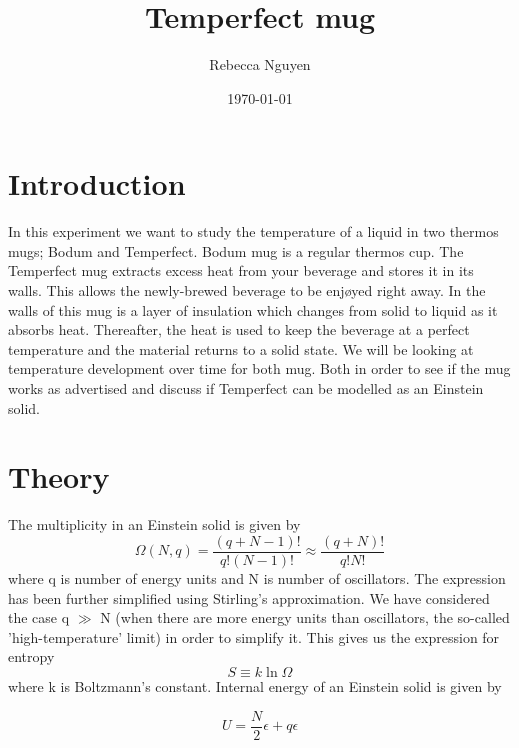 \documentclass[reprint,english,notitlepage]{revtex4-2}
\begin{document}
\title{Temperfect mug}   %
\author{Rebecca Nguyen}               %
\date{\today}                             %
\noaffiliation
\maketitle                                %


\section{Introduction}
In this experiment we want to study the temperature of a liquid in two thermos mugs; Bodum and Temperfect.
Bodum mug is a regular thermos cup. The Temperfect mug extracts excess heat from your beverage and stores it in its walls. This allows the newly-brewed beverage to
be enjøyed right away. In the walls of this mug is a layer of insulation which changes from solid to liquid as it absorbs heat. Thereafter, the heat is used to keep
the beverage at a perfect temperature and the material returns to a solid state.
We will be looking at temperature development over time for both mug. Both in order to see if the mug works as advertised and discuss if Temperfect can be modelled
as an Einstein solid.

\section{Theory}
The multiplicity in an Einstein solid is given by
\begin{equation}
  \Omega(N, q) = \frac{(q+N -1)!}{q! (N -1)!} \approx \frac{(q+N)!}{q!N!}
\end{equation}
where q is number of energy units and N is number of oscillators. The expression has been further simplified using Stirling's approximation. We have considered the case q $\gg$ N (when there are
more energy units than oscillators, the so-called 'high-temperature' limit) in order to simplify it.
This gives us the expression for entropy
\begin{equation}
  S \equiv k \ln\Omega
\end{equation}
where k is Boltzmann's constant.
Internal energy of an Einstein solid is given by

\begin{equation}
  U = \frac{N}{2}\epsilon + q\epsilon
\end{equation}
\end{document}
